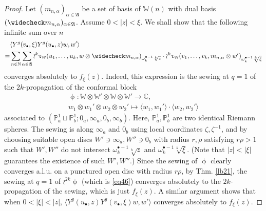 \documentclass[12pt,a4paper,notitlepage]{article}
\theoremstyle{definition}
\theoremstyle{plain}
\newcommand{\fk}{\mathfrak}
\newcommand{\wch}{\widecheck}
\newcommand{\bk}[1]{\langle {#1}\rangle}
\newcommand{\blt}{\bullet}
\newcommand{\Wbb}{\mathbb W}
\newcommand{\Cbb}{\mathbb C}
\newcommand{\Nbb}{\mathbb N}
\newcommand{\Pbb}{\mathbb P}
\numberwithin{equation}{section}
\begin{document}
\begin{proof}
Let $(m_{n,\alpha})_{\alpha\in\fk A}$ be a set of basis of $\Wbb(n)$ with dual basis $(\wch m_{n,\alpha})_{\alpha\in\fk A}$. Assume $0<|z|<\xi$. We shall show that the following infinite sum over $n$
\begin{align}
&\bk{Y^g(v_\blt,\xi)Y^g(u_\blt,z)w,w'}\nonumber\\
=&\sum_{n\in\Nbb}\sum_{\alpha\in\fk A}\wr^k\uptau_\Wbb(u_1,\dots,u_k,w\otimes \wch m_{n,\alpha})_{\omega_k^{\blt-1}\sqrt[k]{z}}\cdot 	\wr^k\uptau_\Wbb(v_1,\dots,v_k,m_{n,\alpha}\otimes w')_{\omega_k^{\blt-1}\sqrt[k]{\xi}}\label{eq46}
\end{align}
converges absolutely to $f_\xi(z)$. Indeed, this expression is the sewing at $q=1$ of the $2k$-propagation of the conformal block
\begin{gather*}
\upphi:\Wbb\otimes\Wbb'\otimes\Wbb\otimes\Wbb'\rightarrow\Cbb,\\ w_1\otimes w_1'\otimes w_2	\otimes w_2'\mapsto \bk{w_1,w_1'}\cdot \bk{w_2,w_2'}
\end{gather*}
associated to $(\Pbb^1_a\sqcup\Pbb^1_b;0_a,\infty_a,0_b,\infty_b)$. Here, $\Pbb^1_a,\Pbb^1_b$ are two identical Riemann spheres.  The sewing is along $\infty_a$ and $0_b$ using local coordinates $\zeta,\zeta^{-1}$, and by choosing suitable open discs $W'\ni\infty_a,W''\ni 0_b$ with radius $r,\rho$ satisfying $r\rho>1$ such that $W',W''$ do not intersect $\omega_k^{\blt-1}\sqrt[k]{z}$ and $\omega_k^{\blt-1}\sqrt[k]{\xi}$. (Note that $|z|<|\xi|$ guarantees the existence of such $W',W''$.) Since the sewing of $\upphi$ clearly converges a.l.u. on a punctured open disc with radius $r\rho$, by Thm. \ref{lb21}, the sewing at $q=1$ of $\wr^{2k}\upphi$ (which is \eqref{eq46}) converges absolutely to the $2k$-propagation of the sewing, which is just $f_\xi(z)$. A similar argument shows that when $0<|\xi|<|z|$, $\bk{Y^g(u_\blt,z)Y^g(v_\blt,\xi)w,w'}$ converges absolutely to $f_\xi(z)$.




\end{proof}
\end{document}

